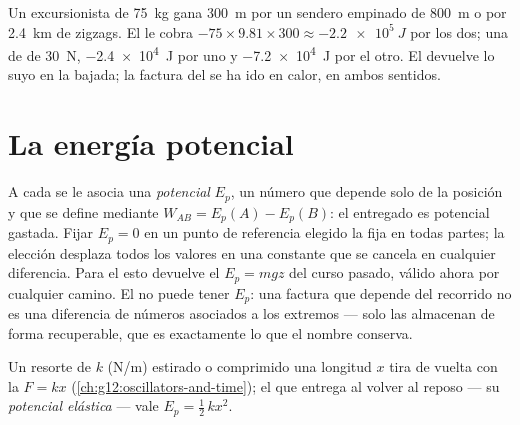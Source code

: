 \begin{example}\label{ex:g12:work-and-energy:trails}
Un excursionista de \qty{75}{kg} gana \qty{300}{m} por un sendero empinado de
\qty{800}{m} o por \qty{2.4}{km} de zigzags. El  le cobra
$-75 \times 9.81 \times 300 \approx \qty{-2.2e5}{J}$ por los dos; una  de
 de \qty{30}{N}, \qty{-2.4e4}{J} por uno y \qty{-7.2e4}{J} por el otro. El
 devuelve lo suyo en la bajada; la factura del  se ha ido en calor, en
ambos sentidos.
\end{example}

\section{La energía potencial}

\begin{definition}\label{def:g12:work-and-energy:ep}
A cada  se le asocia una \emph{ potencial}%
 $E_p$, un número que
depende solo de la posición y que se define mediante $W_{AB} = E_p(A) - E_p(B)$: el
 entregado es  potencial gastada. Fijar $E_p = 0$ en un punto de
referencia elegido la fija en todas partes; la elección desplaza todos los valores en
una constante que se cancela en cualquier diferencia. Para el  esto devuelve el
$E_p = mgz$ del curso pasado, válido ahora por cualquier camino. El  no
puede tener $E_p$: una factura que depende del recorrido no es una diferencia de
números asociados a los extremos --- solo las  almacenan de forma
recuperable, que es exactamente lo que el nombre conserva.
\end{definition}

\begin{proposition}\label{prop:g12:work-and-energy:elastic}
Un resorte de  $k$ (\unit{N/m}) estirado o comprimido una longitud
$x$ tira de vuelta con la  $F = kx$ (\cref{ch:g12:oscillators-and-time}); el
 que entrega al volver al reposo --- su \emph{ potencial elástica}%
 --- vale $E_p = \tfrac12\, k x^2$.
\end{proposition}

